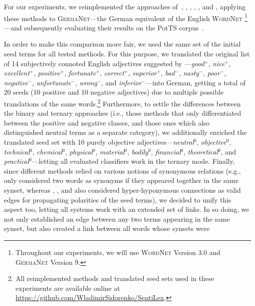 For our experiments, we reimplemented the approaches of~\citet{Hu:04},
\citet{Blair-Goldensohn:08}, \citet{Kim:04,Kim:06}, \citet{Esuli:06c},
\citet{Rao:09}, and \citet{Awadallah:10}, applying these methods to
\textsc{GermaNet}---the German equivalent of the English
\textsc{WordNet} \cite{Hamp:97}\footnote{Throughout our experiments,
  we will use \textsc{WordNet} Version 3.0 and \textsc{GermaNet}
  Version 9.}---and subsequently evaluating their results on the PotTS
corpus~\cite{Sidarenka:16}.

In order to make this comparison more fair, we used the same set of
the initial seed terms for all tested methods.  For this purpose, we
translated the original list of 14 subjectively connoted English
adjectives suggested by \citet{Turney:03}---\emph{good}$^+$,
\emph{nice}$^+$, \emph{excellent}$^+$, \emph{positive}$^+$,
\emph{fortunate}$^+$, \emph{correct}$^+$, \emph{superior}$^+$,
\emph{bad}$^-$, \emph{nasty}$^-$, \emph{poor}$^-$,
\emph{negative}$^-$, \emph{unfortunate}$^-$, \emph{wrong}$^-$, and
\emph{inferior}$^-$---into German, getting a total of 20 seeds (10
positive and 10 negative adjectives) due to multiple possible
translations of the same words.\footnote{All reimplemented methods and
  translated seed sets used in these experiments are available online
  at \url{https://github.com/WladimirSidorenko/SentiLex}.}
Furthermore, to settle the differences between the binary and ternary
approaches (i.e., those methods that only differentiated between the
positive and negative classes, and those ones which also distinguished
neutral terms as a separate category), we additionally enriched the
translated seed set with 10 purely objective
adjectives---\emph{neutral}$^0$, \emph{objective}$^0$,
\emph{technical}$^0$, \emph{chemical}$^0$, \emph{physical}$^0$,
\emph{material}$^0$, \emph{bodily}$^0$, \emph{financial}$^0$,
\emph{theoretical}$^0$, and \emph{practical}$^0$---letting all
evaluated classifiers work in the ternary mode.  Finally, since
different methods relied on various notions of synonymous relations
(e.g., \citet{Hu:04} only considered two words as synonyms if they
appeared together in the same synset, whereas \citet{Esuli:06c},
\citet{Rao:09}, and \citet{Awadallah:10} also considered
hyper-hyponymous connections as valid edges for propagating polarities
of the seed terms), we decided to unify this aspect too, letting all
systems work with an extended set of links.  In so doing, we not only
established an edge between any two terms appearing in the same
synset, but also created a link between all words whose synsets were
